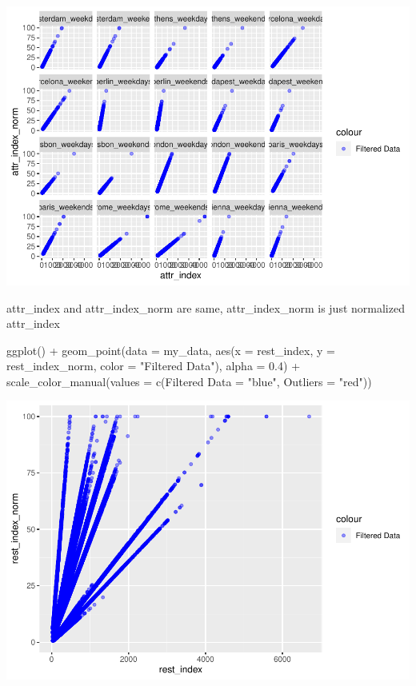 \documentclass[
]{article}
\newenvironment{Shaded}{\begin{snugshade}}{\end{snugshade}}
\newcommand{\AttributeTok}[1]{\textcolor[rgb]{0.77,0.63,0.00}{#1}}
\newcommand{\FloatTok}[1]{\textcolor[rgb]{0.00,0.00,0.81}{#1}}
\newcommand{\FunctionTok}[1]{\textcolor[rgb]{0.00,0.00,0.00}{#1}}
\newcommand{\NormalTok}[1]{#1}
\newcommand{\OtherTok}[1]{\textcolor[rgb]{0.56,0.35,0.01}{#1}}
\newcommand{\SpecialCharTok}[1]{\textcolor[rgb]{0.00,0.00,0.00}{#1}}
\newcommand{\StringTok}[1]{\textcolor[rgb]{0.31,0.60,0.02}{#1}}
\begin{document}
\includegraphics{Project_files/figure-latex/unnamed-chunk-18-2.pdf}

attr\_index and attr\_index\_norm are same, attr\_index\_norm is just
normalized attr\_index

\begin{Shaded}
\begin{Highlighting}[]
\FunctionTok{ggplot}\NormalTok{() }\SpecialCharTok{+} \FunctionTok{geom\_point}\NormalTok{(}\AttributeTok{data =}\NormalTok{ my\_data, }\FunctionTok{aes}\NormalTok{(}\AttributeTok{x =}\NormalTok{ rest\_index, }\AttributeTok{y =}\NormalTok{ rest\_index\_norm,}
    \AttributeTok{color =} \StringTok{"Filtered Data"}\NormalTok{), }\AttributeTok{alpha =} \FloatTok{0.4}\NormalTok{) }\SpecialCharTok{+} \FunctionTok{scale\_color\_manual}\NormalTok{(}\AttributeTok{values =} \FunctionTok{c}\NormalTok{(}\StringTok{\textasciigrave{}}\AttributeTok{Filtered Data}\StringTok{\textasciigrave{}} \OtherTok{=} \StringTok{"blue"}\NormalTok{,}
    \AttributeTok{Outliers =} \StringTok{"red"}\NormalTok{))}
\end{Highlighting}
\end{Shaded}

\includegraphics{Project_files/figure-latex/unnamed-chunk-19-1.pdf}
\end{document}
